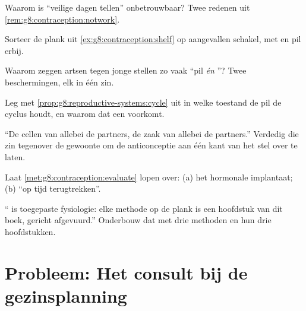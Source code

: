 \begin{exercise}[$\star$]\label{exo:g8:contraception:6}
Waarom is ``veilige dagen tellen'' onbetrouwbaar? Twee redenen uit
\cref{rem:g8:contraception:notwork}.
\end{exercise}

\begin{exercise}[$\star\star$]\label{exo:g8:contraception:7}
Sorteer de plank uit \cref{ex:g8:contraception:shelf} op aangevallen
schakel, met  en pil erbij.
\end{exercise}

\begin{exercise}[$\star\star$]\label{exo:g8:contraception:8}
Waarom zeggen artsen tegen jonge stellen zo vaak ``pil \emph{én}
''? Twee beschermingen, elk in één zin.
\end{exercise}

\begin{exercise}[$\star\star$]\label{exo:g8:contraception:9}
Leg met \cref{prop:g8:reproductive-systems:cycle} uit in welke toestand de
pil de cyclus houdt, en waarom dat een  voorkomt.
\end{exercise}

\begin{exercise}[$\star\star$]\label{exo:g8:contraception:10}
``De cellen van allebei de partners, de zaak van allebei de partners.''
Verdedig die zin tegenover de gewoonte om de anticonceptie aan één kant
van het stel over te laten.
\end{exercise}

\begin{exercise}[$\star\star$]\label{exo:g8:contraception:11}
Laat \cref{met:g8:contraception:evaluate} lopen over: (a) het hormonale
implantaat; (b) ``op tijd terugtrekken''.
\end{exercise}

\begin{exercise}[$\star\star\star$]\label{exo:g8:contraception:12}
`` is toegepaste fysiologie: elke methode op de plank is een
hoofdstuk van dit boek, gericht afgevuurd.'' Onderbouw dat met drie
methoden en hun drie hoofdstukken.
\end{exercise}

\section{Probleem: Het consult bij de gezinsplanning}


